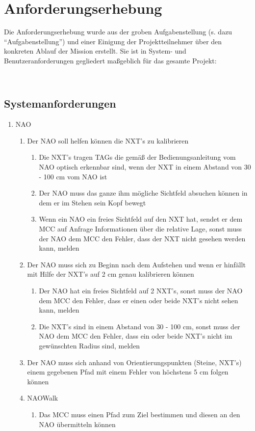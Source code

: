 \chapter{Anforderungserhebung}\label{Anforderungserhebung}

Die Anforderungserhebung wurde aus der groben Aufgabenstellung (s. dazu ``Aufgabenstellung'') und einer Einigung der Projektteilnehmer über den konkreten Ablauf der Mission erstellt. Sie ist in System- und Benutzeranforderungen gegliedert maßgeblich für das gesamte Projekt:

﻿\section{Systemanforderungen}
\begin{enumerate}
    \item NAO
    \begin{enumerate}
        \item Der NAO soll helfen können die NXT's zu kalibrieren
        \begin{enumerate}
            \item Die NXT's tragen TAGs die gemäß der Bedienungsanleitung vom NAO optisch erkennbar sind, wenn der NXT in einem Abstand von 30 - 100 cm vom NAO ist


            \item Der NAO muss das ganze ihm mögliche Sichtfeld absuchen können in dem er im Stehen sein Kopf bewegt

            \item Wenn ein NAO ein freies Sichtfeld auf den NXT hat, sendet er dem MCC auf Anfrage Informationen über die relative Lage, sonst muss der NAO dem MCC den Fehler, dass der NXT nicht gesehen werden kann, melden
        \end{enumerate}
        \item Der NAO muss sich zu Beginn nach dem Aufstehen und wenn er hinfällt mit Hilfe der NXT's auf 2 cm genau kalibrieren können
        \begin{enumerate}
            \item Der NAO hat ein freies Sichtfeld auf 2 NXT's, sonst muss der NAO dem MCC den Fehler, dass er einen oder beide NXT's nicht sehen kann, melden
        
            \item Die NXT's sind in einem Abstand von 30 - 100 cm, sonst muss der NAO dem MCC den Fehler, dass ein oder beide NXT's nicht im gewünschten Radius sind, melden
        \end{enumerate}
        \item Der NAO muss sich anhand von Orientierungspunkten (Steine, NXT's) einem gegebenen Pfad mit einem Fehler von höchstens 5 cm folgen können
		\item NAOWalk
    	\begin{enumerate}
        	\item Das MCC muss einen Pfad zum Ziel bestimmen und diesen an den NAO übermitteln können


\end{enumerate}
\end{enumerate}
\end{enumerate}
